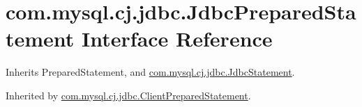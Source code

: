 \hypertarget{interfacecom_1_1mysql_1_1cj_1_1jdbc_1_1_jdbc_prepared_statement}{}\section{com.\+mysql.\+cj.\+jdbc.\+Jdbc\+Prepared\+Statement Interface Reference}
\label{interfacecom_1_1mysql_1_1cj_1_1jdbc_1_1_jdbc_prepared_statement}


Inherits Prepared\+Statement, and \mbox{\hyperlink{interfacecom_1_1mysql_1_1cj_1_1jdbc_1_1_jdbc_statement}{com.\+mysql.\+cj.\+jdbc.\+Jdbc\+Statement}}.



Inherited by \mbox{\hyperlink{classcom_1_1mysql_1_1cj_1_1jdbc_1_1_client_prepared_statement}{com.\+mysql.\+cj.\+jdbc.\+Client\+Prepared\+Statement}}.

